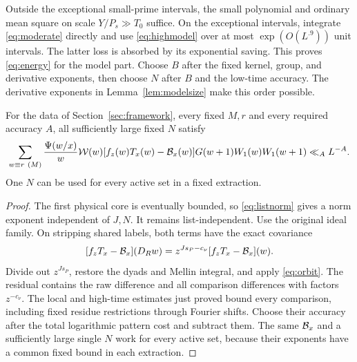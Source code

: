 Outside the exceptional small-prime intervals, the small polynomial
and ordinary mean square on scale $Y/P_s\gg T_0$ suffice.
On the exceptional intervals, integrate \eqref{eq:moderate}
directly and use \eqref{eq:highmodel} over at most
$\exp(O(L^{.9}))$ unit intervals. The latter loss is absorbed by
its exponential saving. This proves \eqref{eq:energy} for the
model part. Choose $B$ after the fixed kernel, group, and derivative
exponents, then choose $N$ after $B$ and the low-time accuracy.
The derivative exponents in Lemma~\ref{lem:modelsize} make this
order possible.

\begin{proposition}\label{prop:modeltransfer}
For the data of Section~\ref{sec:framework}, every fixed $M,r$ and
every required accuracy $A$, all sufficiently large fixed $N$ satisfy
\begin{equation}\label{eq:modeltransfer}
 \sum_{w\equiv r\ (M)}\frac{\Psi(w/x)}w\mathcal W(w)
 [f_z(w)T_x(w)-\mathcal B_x(w)]G(w+1)W_1(w)W_1(w+1)
 \ll_A L^{-A}.
\end{equation}
One $N$ can be used for every active set in a fixed extraction.
\end{proposition}

\begin{proof}
The first physical core is eventually bounded, so
\eqref{eq:listnorm} gives a norm exponent independent of $J,N$.
It remains list-independent. Use the original ideal family.
On stripping shared labels, both terms have the exact covariance
\[
 [f_zT_x-\mathcal B_x](D_Rw)
      =z^{Js_P-c_\nu}[f_zT_x-\mathcal B_x](w).
\]
Divide out $z^{Js_P}$, restore the dyads and Mellin integral, and
apply \eqref{eq:orbit}. The residual contains the raw difference
and all comparison differences with factors $z^{-c_\nu}$.
The local and high-time estimates just proved bound every comparison,
including fixed residue restrictions through Fourier shifts.
Choose their accuracy after the total logarithmic pattern cost and
subtract them. The same $\mathcal B_x$ and a sufficiently large single $N$
work for every active set, because their exponents have a common
fixed bound in each extraction.
\end{proof}

